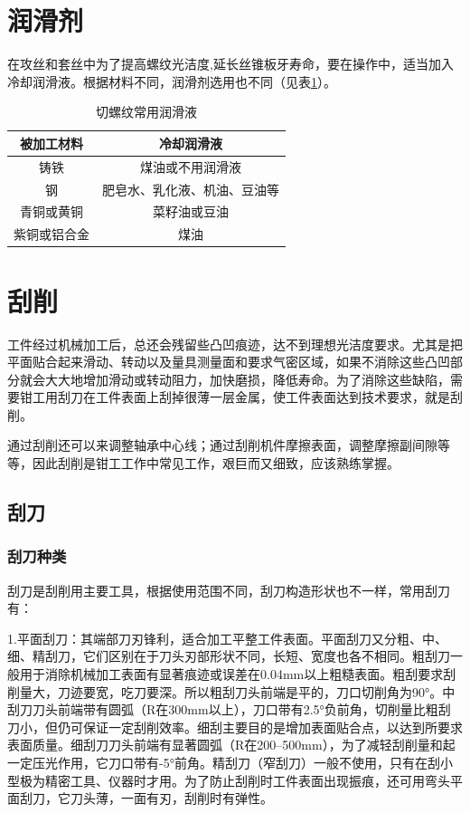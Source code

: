 \documentclass{ctexbook}
\begin{document}
\section{润滑剂}
在攻丝和套丝中为了提高螺纹光洁度,延长丝锥板牙寿命，要在操作中，适当加入冷却润滑液。根据材料不同，润滑剂选用也不同（见表\ref{tab:qieluowen}）。

\begin{table}[htbp]
	\centering
	\caption{切螺纹常用润滑液}
	\begin{tabular}{c|c}
		 \hline
		被加工材料 & 冷却润滑液 \\ \hline
		铸铁    & 煤油或不用润滑液 \\ \hline
		钢     & 肥皂水、乳化液、机油、豆油等 \\ \hline
		青铜或黄铜 & 菜籽油或豆油 \\ \hline
		紫铜或铝合金 & 煤油 \\ \hline
	\end{tabular}%
	\label{tab:qieluowen}%
\end{table}%
\section{刮削}
工件经过机械加工后，总还会残留些凸凹痕迹，达不到理想光洁度要求。尤其是把平面贴合起来滑动、转动以及量具测量面和要求气密区域，如果不消除这些凸凹部分就会大大地增加滑动或转动阻力，加快磨损，降低寿命。为了消除这些缺陷，需要钳工用刮刀在工件表面上刮掉很薄一层金属，使工件表面达到技术要求，就是刮削。

通过刮削还可以来调整轴承中心线；通过刮削机件摩擦表面，调整摩擦副间隙等等，因此刮削是钳工工作中常见工作，艰巨而又细致，应该熟练掌握。
\subsection{刮刀}
\subsubsection{刮刀种类}
刮刀是刮削用主要工具，根据使用范围不同，刮刀构造形状也不一样，常用刮刀有：

1.平面刮刀：其端部刀刃锋利，适合加工平整工件表面。平面刮刀又分粗、中、细、精刮刀，它们区别在于刀头刃部形状不同，长短、宽度也各不相同。粗刮刀一般用于消除机械加工表面有显著痕迹或误差在0.04mm以上粗糙表面。粗刮要求刮削量大，刀迹要宽，吃刀要深。所以粗刮刀头前端是平的，刀口切削角为90°。中刮刀刀头前端带有圆弧（R在300mm以上），刀口带有2.5°负前角，切削量比粗刮刀小，但仍可保证一定刮削效率。细刮主要目的是增加表面贴合点，以达到所要求表面质量。细刮刀刀头前端有显著圆弧（R在200--500mm），为了减轻刮削量和起一定压光作用，它刀口带有-5°前角。精刮刀（窄刮刀）一般不使用，只有在刮小型极为精密工具、仪器时才用。为了防止刮削时工件表面出现振痕，还可用弯头平面刮刀，它刀头薄，一面有刃，刮削时有弹性。
\end{document}
